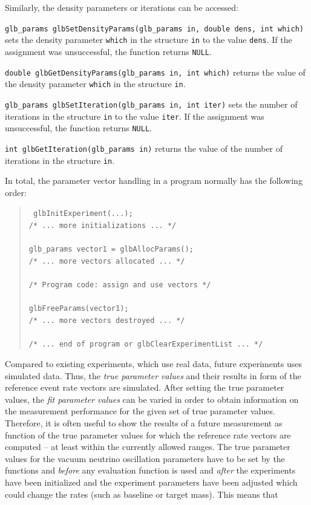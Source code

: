 Similarly, the density parameters or iterations can be accessed:
\begin{function}
{\tt glb\_params glbSetDensityParams(glb\_params in, double dens, int which)} sets the density parameter {\tt which} in the structure {\tt in}
to the value {\tt dens}. If the assignment was unsuccessful, the 
function returns {\tt NULL}.
\end{function}
\begin{function}
{\tt double glbGetDensityParams(glb\_params in, int which)}
returns the value of the density parameter {\tt which} in the 
structure {\tt in}.
\end{function}
\begin{function}
{\tt glb\_params glbSetIteration(glb\_params in, int iter)} sets the number of iterations in the structure {\tt in}
to the value {\tt iter}. If the assignment was unsuccessful, the 
function returns {\tt NULL}.
\end{function}
\begin{function}
{\tt int glbGetIteration(glb\_params in)}
returns the value of the number of iterations in the 
structure {\tt in}.
\end{function}
In total, the parameter vector handling in a program normally has the
following order:
\begin{quote}
{\tt
glbInitExperiment(...); \\
/* ... more initializations ... */ \\
\\
glb\_params vector1 = glbAllocParams(); \\
/* ... more vectors allocated ... */ \\
\\
/* Program code: assign and use vectors */ \\
\\
glbFreeParams(vector1); \\
/* ... more vectors destroyed ... */ \\
\\
/* ... end of program or glbClearExperimentList ... */ 
}
\end{quote}
Compared to existing experiments, which use real data, future experiments
uses simulated data. Thus, the {\em true parameter values} and their results in form of the reference event rate vectors are simulated. After setting the true parameter values, the {\em fit parameter values} can be varied in order to obtain information on the measurement performance for the given set of true parameter values. Therefore, it is often useful to show the results of a future measurement as function of the true parameter values for which the reference rate vectors are computed -- at least within the currently allowed ranges. The true parameter values for the vacuum neutrino oscillation parameters have to be set by the functions  and  {\em before} any evaluation function is used and {\em after} the experiments have been initialized and the experiment parameters have been adjusted which could change the rates (such as baseline or target mass). This means that

